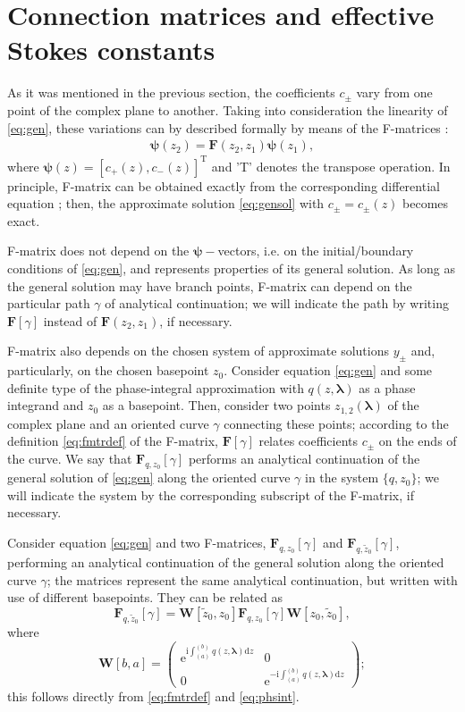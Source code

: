 \documentclass[atmp]{ipart_v1}
\def\rmd{\mathrm{d}}
\def\rme{\mathrm{e}}
\def\rmi{\mathrm{i}}
\def\lmbd{\bm{\lambda}}
\def\psii{\bm\psi}
\def\F{\bm{F}}
\def\W{\bm{W}}
\def\T{\mathrm{T}}
\newcommand\eref[1]{\eqref{#1}}
\newcommand\phsintgrnd[1][z]{q(#1,\lmbd)}
\newcommand\phsintgrl[3][z]{\int_{#2}^{#3} \phsintgrnd[#1] \rmd #1}
\begin{document}
\section{Connection matrices and effective Stokes constants \label{sec:fmtrintro}}
As it was mentioned in the previous section, the coefficients $c_\pm$ 
vary from one point of the complex plane to another. Taking into consideration
the linearity of \eref{eq:gen}, these variations can by described formally by means 
of the F-matrices \cite{frbook}:
\begin{eqnarray}
\psii(z_2) = \F(z_2,z_1) \psii(z_1),
\label{eq:fmtrdef}
\end{eqnarray}
where $\psii(z) = [{c_+(z),c_-(z)}]^{\T}$ and 'T' denotes the transpose operation.
In principle, F-matrix can be obtained exactly from the corresponding differential 
equation \cite{frbook}; then, the approximate solution \eref{eq:gensol} 
with $c_\pm=c_\pm(z)$ becomes exact.  

F-matrix does not depend on the $\psii-$vectors, i.e. on the initial/boundary conditions 
of \eref{eq:gen}, and represents properties of its general solution. 
As long as the general solution may have branch points, 
F-matrix can depend on the particular path $\gamma$ of analytical continuation; 
we will indicate the path by writing $\F[\gamma]$ instead of $\F(z_2,z_1)$, if necessary.
 
F-matrix also depends on the chosen system of approximate solutions $y_\pm$ and, 
particularly, on the chosen basepoint $z_0$. Consider equation \eref{eq:gen} and some definite
type of the phase-integral approximation with $q(z,\lmbd)$ as a phase integrand 
and $z_0$ as a basepoint. Then, consider two points $z_{1,2}(\lmbd)$ of the complex plane 
and an oriented curve $\gamma$ connecting these points; 
according to the definition \eref{eq:fmtrdef} of the F-matrix, 
$\F[\gamma]$ relates coefficients $c_\pm$ on the ends of the curve. We say 
that $\F_{q,z_0}[\gamma]$ performs an analytical continuation of the general solution of \eref{eq:gen} 
along the oriented curve $\gamma$ in the system $\{q,z_0\}$; we will indicate the
system by the corresponding subscript of the F-matrix, if necessary.

Consider equation \eref{eq:gen} and two F-matrices, $\F_{q,z_0}[\gamma]$ and $\F_{q,\tilde{z}_0}[\gamma]$, 
performing an analytical continuation of the general solution along the oriented curve $\gamma$; the matrices
represent the same analytical continuation, but written with use of different basepoints. They can be related as
\begin{equation}
\F_{q,\tilde{z}_0}[\gamma] = \W[\tilde{z}_0,z_0]\F_{q,z_0}[\gamma]\W[z_0,\tilde{z}_0],
\label{eq:bpchange} 
\end{equation}
where
\begin{equation}
\W[b,a] =  
\left(\begin{array}{*{2}{c}}
\rme^{\rmi \phsintgrl{(a)}{(b)}} & 0 \\ 0 & \rme^{-\rmi \phsintgrl{(a)}{(b)}} 
\end{array}\right);
\label{eq:W}
\end{equation}
this follows directly from \eref{eq:fmtrdef} and \eref{eq:phsint}. 
\end{document}
